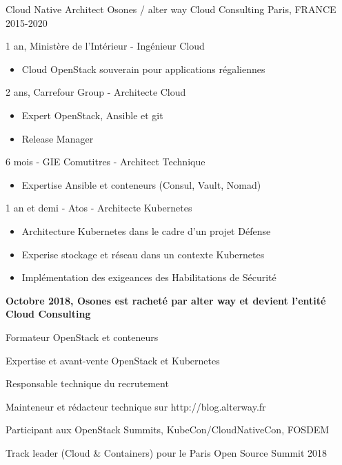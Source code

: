 \begin{cventries}
  \cventry
    {Cloud Native Architect} %
    {Osones / alter way Cloud Consulting} %
    {Paris, FRANCE} %
    {2015-2020} %
    {
      \begin{cvitems} %
      \item {1 an, Ministère de l'Intérieur - Ingénieur Cloud}
          \begin{itemize}
            \item {Cloud OpenStack souverain pour applications régaliennes}
          \end{itemize}
        \item {2 ans, Carrefour Group - Architecte Cloud}
          \begin{itemize}
            \item {Expert OpenStack, Ansible et git}
            \item {Release Manager}
          \end{itemize}
        \item {6 mois - GIE Comutitres - Architect Technique}
          \begin{itemize}
            \item {Expertise Ansible et conteneurs (Consul, Vault, Nomad)}
          \end{itemize}
        \item {1 an et demi - Atos - Architecte Kubernetes}
        \begin{itemize}
          \item {Architecture Kubernetes dans le cadre d'un projet Défense}
          \item {Experise stockage et réseau dans un contexte Kubernetes}
          \item {Implémentation des exigeances des Habilitations de Sécurité}
          \end{itemize}
        \item {\textbf{Octobre 2018, Osones est racheté par alter way et devient
        l'entité Cloud Consulting}}
        \item {Formateur OpenStack et conteneurs}
        \item {Expertise et avant-vente OpenStack et Kubernetes}
        \item {Responsable technique du recrutement}
        \item {Mainteneur et rédacteur technique sur http://blog.alterway.fr}
        \item {Participant aux OpenStack Summits, KubeCon/CloudNativeCon, FOSDEM}
        \item {Track leader (Cloud \& Containers) pour le Paris Open Source Summit
        2018}
      \end{cvitems}
    }


\end{cventries}
